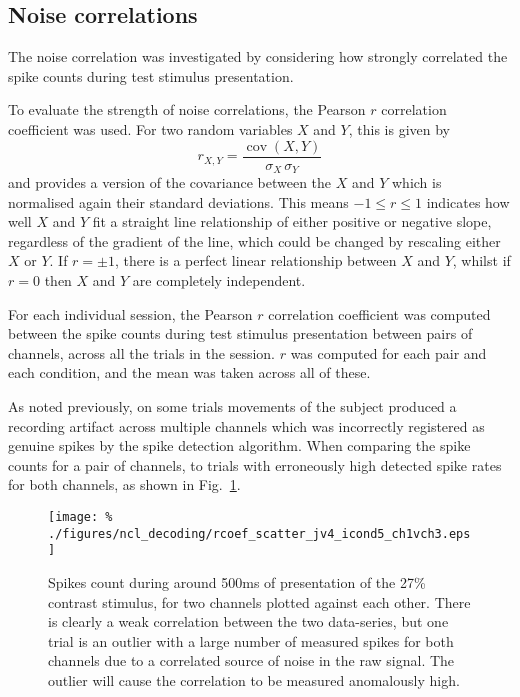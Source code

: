 \subsection{Noise correlations}
\label{sec:dec-meth-noise}

The noise correlation was investigated by considering how strongly correlated the spike counts during test stimulus presentation.

To evaluate the strength of noise correlations, the Pearson $r$ correlation coefficient was used. For two random variables $X$ and $Y$, this is given by
$$r_{X,Y} = \frac{\operatorname{cov}(X,Y)}{\sigma_X \, \sigma_Y}$$
and provides a version of the covariance between the $X$ and $Y$ which is normalised again their standard deviations.
This means $-1 \le r \le 1$ indicates how well $X$ and $Y$ fit a straight line relationship of either positive or negative slope, regardless of the gradient of the line, which could be changed by rescaling either $X$ or $Y$. If $r=\pm1$, there is a perfect linear relationship between $X$ and $Y$, whilst if $r=0$ then $X$ and $Y$ are completely independent.

For each individual session, the Pearson $r$ correlation coefficient was computed between the spike counts during test stimulus presentation between pairs of channels, across all the trials in the session. $r$ was computed for each pair and each condition, and the mean was taken across all of these.

As noted previously, on some trials movements of the subject produced a recording artifact across multiple channels which was incorrectly registered as genuine spikes by the spike detection algorithm. When comparing the spike counts for a pair of channels, to trials with erroneously high detected spike rates for both channels, as shown in Fig.~\ref{fig:noise_scatter}.

\begin{figure}[htbp]
\centering\texttt{[image: \%
./figures/ncl\_decoding/rcoef\_scatter\_jv4\_icond5\_ch1vch3.eps]}
\caption{Spikes count during around 500ms of presentation of the 27\% contrast stimulus, for two channels plotted against each other. There is clearly a weak correlation between the two data-series, but one trial is an outlier with a large number of measured spikes for both channels due to a correlated source of noise in the raw signal. The outlier will cause the correlation to be measured anomalously high.}
\label{fig:noise_scatter}
\end{figure}

